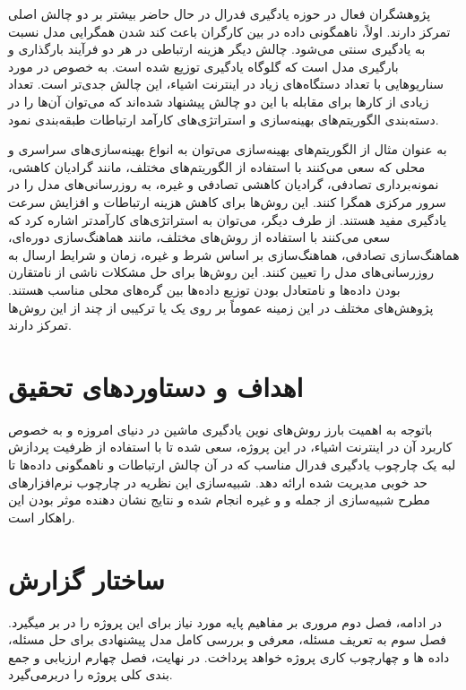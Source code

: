 پژوهشگران فعال در حوزه یادگیری فدرال در حال حاضر بیشتر بر دو چالش اصلی تمرکز دارند. اولاً، ناهمگونی داده در بین کارگران باعث کند شدن همگرایی مدل نسبت به یادگیری سنتی می‌شود. چالش دیگر هزینه ارتباطی در هر دو فرآیند بارگذاری و بارگیری مدل است که گلوگاه یادگیری توزیع شده است. به‌ خصوص در مورد سناریوهایی با تعداد دستگاه‌های زیاد در اینترنت اشیاء، این چالش جدی‌تر است. تعداد زیادی از کارها برای مقابله با این دو چالش پیشنهاد شده‌اند که می‌توان آن‌ها را در دسته‌بندی الگوریتم‌های بهینه‌سازی و استراتژی‌های کارآمد ارتباطات طبقه‌بندی نمود\cite{book_1}\cite{edge1}\cite{edge2}.

به عنوان مثال از الگوریتم‌های بهینه‌سازی می‌توان به انواع بهینه‌سازی‌های سراسری و محلی که سعی می‌کنند با استفاده از الگوریتم‌های مختلف، مانند گرادیان کاهشی، نمونه‌برداری تصادفی، گرادیان کاهشی تصادفی و غیره، به روزرسانی‌های مدل را در سرور مرکزی همگرا کنند. این روش‌ها برای کاهش هزینه ارتباطات و افزایش سرعت یادگیری مفید هستند. از طرف دیگر، می‌توان به استراتژی‌های کارآمدتر اشاره کرد که سعی می‌کنند با استفاده از روش‌های مختلف، مانند هماهنگ‌سازی دوره‌ای، هماهنگ‌سازی تصادفی، هماهنگ‌سازی بر اساس شرط و غیره، زمان و شرایط ارسال به روزرسانی‌های مدل را تعیین کنند. این روش‌ها برای حل مشکلات ناشی از نامتقارن بودن داده‌ها و نامتعادل بودن توزیع داده‌ها بین گره‌های محلی مناسب هستند. پژوهش‌های مختلف در این زمینه عموماً بر روی یک یا ترکیبی از چند از این روش‌ها تمرکز دارند.

\section{اهداف و دستاوردهای تحقیق}

باتوجه به اهمیت بارز روش‌های نوین یادگیری ماشین در دنیای امروزه و به خصوص کاربرد آن در اینترنت اشیاء، در این پروژه، سعی شده تا با استفاده از ظرفیت پردازش لبه یک چارچوب یادگیری فدرال مناسب که در آن چالش ارتباطات و ناهمگونی داده‌ها تا حد خوبی مدیریت شده ارائه دهد. شبیه‌سازی این نظریه در چارچوب نرم‌افزار‌های مطرح شبیه‌سازی از جمله  و  و غیره انجام شده و نتایج نشان دهنده موثر بودن این راهکار است.

\section{ساختار گزارش}

در ادامه، فصل دوم مروری بر مفاهیم پایه مورد نیاز برای این پروژه را در بر میگیرد. فصل سوم به تعریف مسئله، معرفی و بررسی کامل مدل پیشنهادی برای حل مسئله، داده ها و چهارچوب کاری پروژه خواهد پرداخت. در نهایت، فصل چهارم ارزیابی و جمع بندی کلی پروژه را دربرمی‌گیرد.
